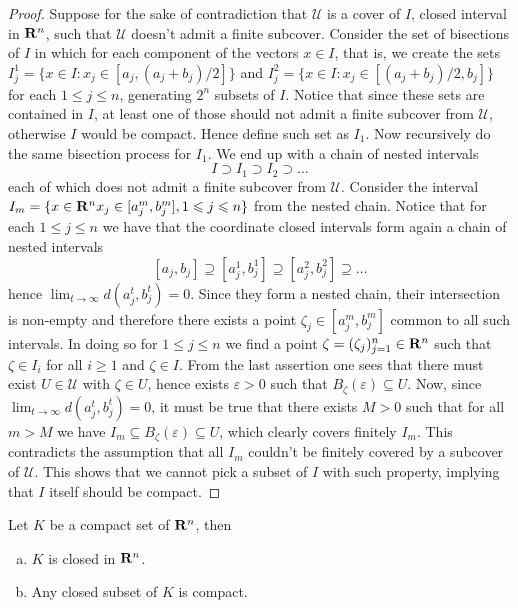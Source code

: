 \begin{proof}
    Suppose for the sake of contradiction that \(\mathcal U\) is a cover of \(I\),
    closed interval in \(\mathbf{R}^n\), such that \(\mathcal U\) doesn't admit a finite
    subcover. Consider the set of bisections of \(I\) in which for each component
    of the vectors \(x \in I\), that is, we create the sets \(I_j^1 = \{x \in I \colon
    x_j \in [a_j, (a_j + b_j)/2]\}\) and \(I_j^2 = \{x \in I \colon x_j \in [(a_j +
        b_j)/2, b_j]\}\) for each \(1 \leq j \leq n\), generating \(2^n\) subsets of
    \(I\). Notice that since these sets are contained in \(I\), at least one of
    those should not admit a finite subcover from \(\mathcal U\), otherwise \(I\)
    would be compact. Hence define such set as \(I_1\). Now recursively do the
    same bisection process for \(I_1\). We end up with a chain of nested intervals
    \[
        I \supset I_1 \supset I_2 \supset \dots
    \]
    each of which does not admit a finite subcover from \(\mathcal U\). Consider
    the interval \(I_m = \{x \in \mathbf{R}^n \relax x_j \in [a^m_j, b_j^m], 1 \leqslant j \leqslant n\}\)
    from the nested chain. Notice that for each \(1 \leq j \leq n\) we have that
    the coordinate closed intervals form again a chain of nested intervals
    \[
        [a_j, b_j] \supseteq [a_j^1, b_j^1] \supseteq [a_j^2, b_j^2] \supseteq \dots
    \]
    hence \(\lim_{t \to \infty} d(a_j^t, b_j^t) = 0\). Since they form a nested
    chain, their intersection is non-empty and therefore there exists a point
    \(\zeta_j \in  [a_j^m, b_j^m]\) common to all such intervals. In doing so for
    \(1 \leq j \leq n\) we find a point \(\zeta = (\zeta_j)_{j=1}^n \in \mathbf{R}^n\)
    such that \(\zeta \in I_i\) for all \(i \geq 1\) and \(\zeta \in I\). From the
    last assertion one sees that there must exist \(U \in \mathcal U\) with
    \(\zeta \in U\), hence exists \(\varepsilon > 0\) such that
    \(B_\zeta(\varepsilon) \subseteq U\). Now, since \(\lim_{t \to \infty}
    d(a_j^t, b_j^t) = 0\), it must be true that there exists \(M > 0\) such that
    for all \(m > M\) we have \(I_m \subseteq B_\zeta(\varepsilon) \subseteq U\),
    which clearly covers finitely \(I_m\). This contradicts the assumption that
    all \(I_m\) couldn't be finitely covered by a subcover of \(\mathcal U\). This
    shows that we cannot pick a subset of \(I\) with such property, implying that
    \(I\) itself should be compact.
\end{proof}

\begin{proposition}\label{prop: compact-close}
    Let \(K\) be a compact set of \(\mathbf{R}^n\), then
    \begin{enumerate}[(a)]
        \item \(K\) is closed in \(\mathbf{R}^n\).
        \item Any closed subset of \(K\) is compact.
    \end{enumerate}
\end{proposition}

